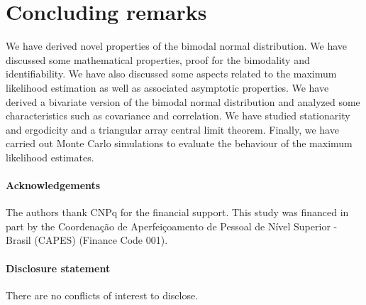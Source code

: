 \documentclass[12pt]{article}
\def\orcid#1{\kern .08em\href{https://orcid.org/#1}{\texttt{[image: orcid.pdf]}}}
\theoremstyle{definition}
\begin{document}
\section{Concluding remarks}\label{sec:concluremarks}
We have derived novel properties of the bimodal normal distribution. We have discussed some mathematical properties, proof for the bimodality and identifiability. We have also discussed some aspects related to the maximum likelihood estimation as well as associated asymptotic properties. We have derived a bivariate version of the bimodal normal distribution and analyzed some characteristics such as covariance and correlation. We have studied stationarity and ergodicity and a triangular array central limit theorem. Finally, we have carried out Monte Carlo simulations to evaluate the behaviour of the maximum likelihood estimates.

\clearpage

\paragraph{Acknowledgements}
The authors thank CNPq for the financial support. This study was financed in part by the Coordenação de Aperfeiçoamento de Pessoal de Nível Superior - Brasil (CAPES) (Finance Code 001).

\paragraph{Disclosure statement}
There are no conflicts of interest to disclose.






%
\end{document}
